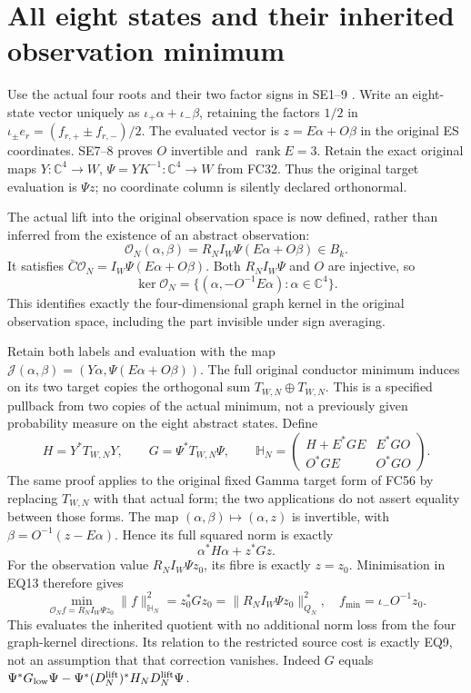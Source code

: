 \documentclass[11pt]{article}
\newcommand{\C}{\mathbb C}
\newcommand{\rank}{\operatorname{rank}}
\begin{document}
\section{All eight states and their inherited observation minimum}
Use the actual four roots and their two factor signs in SE1--9
\cite{FC}. Write an eight-state vector uniquely as
$\iota_+\alpha+\iota_-\beta$, retaining the factors $1/2$ in
$\iota_\pm e_r=(f_{r,+}\pm f_{r,-})/2$. The evaluated vector is
$z=E\alpha+O\beta$ in the original ES coordinates. SE7--8 proves
$O$ invertible and $\rank E=3$. Retain the exact original maps
$Y:\C^4\to W$, $\Psi=YK^{-1}:\C^4\to W$ from FC32.
Thus the original target evaluation is $\Psi z$; no coordinate
column is silently declared orthonormal.

The actual lift into the original observation space is now defined,
rather than inferred from the existence of an abstract observation:
\[
 \mathcal O_N(\alpha,\beta)=R_NI_W\Psi(E\alpha+O\beta)\in B_k.
                                                                    \tag{EQ10}
\]
It satisfies $\bar C\mathcal O_N=I_W\Psi(E\alpha+O\beta)$.
Both $R_NI_W\Psi$ and $O$ are injective, so
\[
 \ker\mathcal O_N=\{(\alpha,-O^{-1}E\alpha):\alpha\in\C^4\}.
                                                                    \tag{EQ11}
\]
This identifies exactly the four-dimensional graph kernel in the
original observation space, including the part invisible under sign
averaging.

Retain both labels and evaluation with the map
$\mathcal J(\alpha,\beta)=(Y\alpha,\Psi(E\alpha+O\beta))$.
The full original conductor minimum induces on its two target copies
the orthogonal sum $T_{W,N}\oplus T_{W,N}$. This is a specified
pullback from two copies of the actual minimum, not a previously
given probability measure on the eight abstract states. Define
\[
 H=Y^*T_{W,N}Y,\qquad G=\Psi^*T_{W,N}\Psi,
 \qquad
 \mathbb H_N=\begin{pmatrix}
 H+E^*GE&E^*GO\\O^*GE&O^*GO
 \end{pmatrix}.                                                     \tag{EQ12}
\]
The same proof applies to the original fixed Gamma target form
of FC56 by replacing $T_{W,N}$ with that actual form; the two
applications do not assert equality between those forms.
The map $(\alpha,\beta)\mapsto(\alpha,z)$ is invertible, with
$\beta=O^{-1}(z-E\alpha)$. Hence its full squared norm is exactly
\[
 \alpha^*H\alpha+z^*Gz.                                             \tag{EQ13}
\]
For the observation value $R_NI_W\Psi z_0$, its fibre is exactly
$z=z_0$. Minimisation in EQ13 therefore gives
\[
 \boxed{\min_{\mathcal O_N f=R_NI_W\Psi z_0}\|f\|_{\mathbb H_N}^2
       =z_0^*Gz_0=\|R_NI_W\Psi z_0\|_{Q_N}^2,\quad
       f_{\min}=\iota_-O^{-1}z_0.}                                  \tag{EQ14}
\]
This evaluates the inherited quotient with no additional norm loss
from the four graph-kernel directions. Its relation to the restricted
source cost is exactly EQ9, not an assumption that that correction
vanishes. Indeed $G$ equals
$\Psi^*G_{\rm low}\Psi-\Psi^*(D_N^{\rm lift})^*H_ND_N^{\rm lift}\Psi$.
\end{document}
